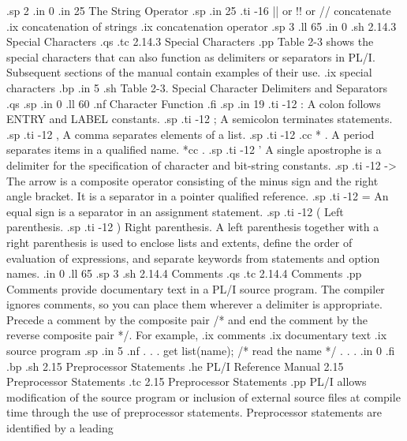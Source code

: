.sp 2
.in 0
.in 25
The String Operator
.sp
.in 25
.ti -16
|| or !! or //  concatenate
.ix concatenation of strings
.ix concatenation operator
.sp 3
.ll 65
.in 0
.sh
2.14.3  Special Characters 
.qs
.tc         2.14.3  Special Characters 
.pp
Table 2-3 shows the special characters that can also function as delimiters
or separators in PL/I.  Subsequent sections of the manual contain examples
of their use.  
.ix special characters
.bp
.in 5
.sh
Table 2-3.  Special Character Delimiters and Separators
.qs
.sp
.in 0
.ll 60
.nf
   Character                       Function
.fi
.sp
.in 19
.ti -12 
:           A colon follows ENTRY and LABEL constants.
.sp
.ti -12
;           A semicolon terminates statements.
.sp
.ti -12
,           A comma separates elements of a list.
.sp
.ti -12
.cc *
.           A period separates items in a qualified name.
*cc .
.sp
.ti -12
'           A single apostrophe is a delimiter for the specification of 
character and bit-string constants.
.sp
.ti -12
->          The arrow is a composite operator consisting of the minus sign and 
the right angle bracket.  It is a separator in a pointer qualified reference.
.sp
.ti -12
=           An equal sign is a separator in an assignment statement.
.sp 
.ti -12
(           Left parenthesis.
.sp
.ti -12
)           Right parenthesis.  A left parenthesis together with a right 
parenthesis is used to enclose lists and extents, define the 
order of evaluation of expressions, and separate keywords from 
statements and option names.
.in 0
.ll 65
.sp 3
.sh
2.14.4  Comments
.qs
.tc         2.14.4  Comments
.pp
Comments provide documentary text in a PL/I source program.  The compiler 
ignores comments, so you can place them wherever a delimiter is appropriate.  
Precede a comment by the composite pair /* and end the comment by the reverse 
composite pair */.  For example,
.ix comments
.ix documentary text
.ix source program
.sp
.in 5
.nf
   .                                            
   .                                            
   .                                            
get list(name);  /* read the name */            
   .                                            
   .                                            
   .                                            
.in 0
.fi
.bp
.sh
2.15  Preprocessor Statements
.he PL/I Reference Manual               2.15  Preprocessor Statements
.tc    2.15  Preprocessor Statements
.pp
PL/I allows modification of the source program or inclusion of external source 
files at compile time through the use of preprocessor statements.  
Preprocessor statements are identified by a leading %
